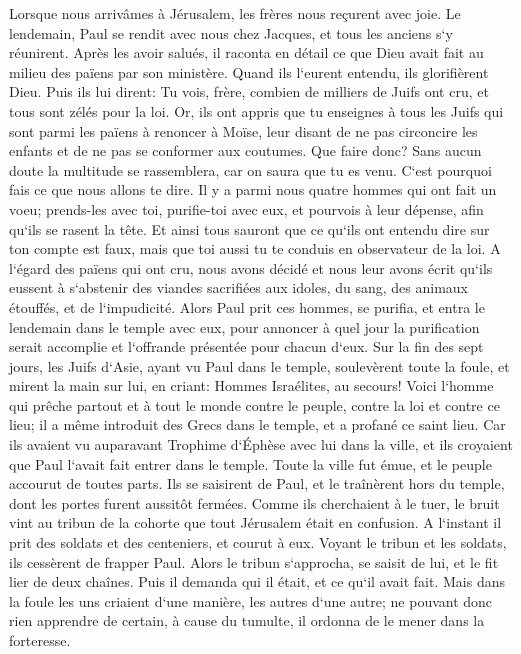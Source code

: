 \verse Lorsque nous arrivâmes à Jérusalem, les frères nous reçurent avec joie. 
\verse Le lendemain, Paul se rendit avec nous chez Jacques, et tous les anciens s`y réunirent. 
\verse Après les avoir salués, il raconta en détail ce que Dieu avait fait au milieu des païens par son ministère. 
\verse Quand ils l`eurent entendu, ils glorifièrent Dieu. Puis ils lui dirent: Tu vois, frère, combien de milliers de Juifs ont cru, et tous sont zélés pour la loi. 
\verse Or, ils ont appris que tu enseignes à tous les Juifs qui sont parmi les païens à renoncer à Moïse, leur disant de ne pas circoncire les enfants et de ne pas se conformer aux coutumes. 
\verse Que faire donc? Sans aucun doute la multitude se rassemblera, car on saura que tu es venu. 
\verse C`est pourquoi fais ce que nous allons te dire. Il y a parmi nous quatre hommes qui ont fait un voeu; 
\verse prends-les avec toi, purifie-toi avec eux, et pourvois à leur dépense, afin qu`ils se rasent la tête. Et ainsi tous sauront que ce qu`ils ont entendu dire sur ton compte est faux, mais que toi aussi tu te conduis en observateur de la loi. 
\verse A l`égard des païens qui ont cru, nous avons décidé et nous leur avons écrit qu`ils eussent à s`abstenir des viandes sacrifiées aux idoles, du sang, des animaux étouffés, et de l`impudicité. 
\verse Alors Paul prit ces hommes, se purifia, et entra le lendemain dans le temple avec eux, pour annoncer à quel jour la purification serait accomplie et l`offrande présentée pour chacun d`eux. 
\verse Sur la fin des sept jours, les Juifs d`Asie, ayant vu Paul dans le temple, soulevèrent toute la foule, et mirent la main sur lui, 
\verse en criant: Hommes Israélites, au secours! Voici l`homme qui prêche partout et à tout le monde contre le peuple, contre la loi et contre ce lieu; il a même introduit des Grecs dans le temple, et a profané ce saint lieu. 
\verse Car ils avaient vu auparavant Trophime d`Éphèse avec lui dans la ville, et ils croyaient que Paul l`avait fait entrer dans le temple. 
\verse Toute la ville fut émue, et le peuple accourut de toutes parts. Ils se saisirent de Paul, et le traînèrent hors du temple, dont les portes furent aussitôt fermées. 
\verse Comme ils cherchaient à le tuer, le bruit vint au tribun de la cohorte que tout Jérusalem était en confusion. 
\verse A l`instant il prit des soldats et des centeniers, et courut à eux. Voyant le tribun et les soldats, ils cessèrent de frapper Paul. 
\verse Alors le tribun s`approcha, se saisit de lui, et le fit lier de deux chaînes. Puis il demanda qui il était, et ce qu`il avait fait. 
\verse Mais dans la foule les uns criaient d`une manière, les autres d`une autre; ne pouvant donc rien apprendre de certain, à cause du tumulte, il ordonna de le mener dans la forteresse. 
